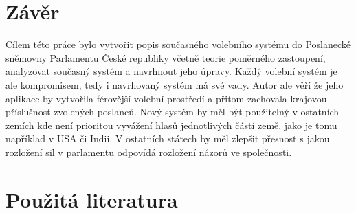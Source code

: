 \documentclass[12pt]{report}
\begin{document}
\section{Závěr} 
Cílem této práce bylo vytvořit popis současného volebního systému do Poslanecké sněmovny Parlamentu České republiky včetně teorie poměrného zastoupení, analyzovat současný systém a navrhnout jeho úpravy.
Každý volební systém je ale kompromisem, tedy i navrhovaný systém má své vady.
Autor ale věří že jeho aplikace by vytvořila férovější volební prostředí a přitom zachovala krajovou příslušnost zvolených poslanců.
Nový systém by měl být použitelný v ostatních zemích kde není prioritou vyvážení hlasů jednotlivých částí země, jako je tomu například v USA či Indii.
V ostatních státech by měl zlepšit přesnost s jakou rozložení sil v parlamentu odpovídá rozložení názorů ve společnosti.
\section*{Použitá literatura}
\printbibliography[heading=none]
\end{document}

